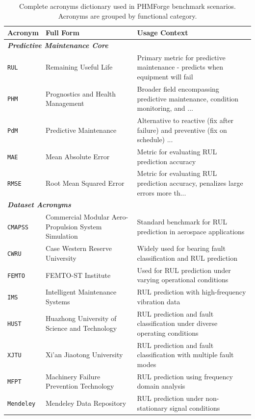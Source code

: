 \begin{table}[ht]
\caption{Complete acronyms dictionary used in PHMForge benchmark scenarios. Acronyms are grouped by functional category.}
\label{app:acronyms}
\centering
\small
\begin{tabular}{@{}lll@{}}
\toprule
\textbf{Acronym} & \textbf{Full Form} & \textbf{Usage Context} \\
\midrule
\multicolumn{3}{l}{\textbf{\textit{Predictive Maintenance Core}}} \\
\texttt{RUL} & Remaining Useful Life & Primary metric for predictive maintenance - predicts when equipment will fail \\
\texttt{PHM} & Prognostics and Health Management & Broader field encompassing predictive maintenance, condition monitoring, and ... \\
\texttt{PdM} & Predictive Maintenance & Alternative to reactive (fix after failure) and preventive (fix on schedule) ... \\
\texttt{MAE} & Mean Absolute Error & Metric for evaluating RUL prediction accuracy \\
\texttt{RMSE} & Root Mean Squared Error & Metric for evaluating RUL prediction accuracy, penalizes large errors more th... \\
\midrule
\multicolumn{3}{l}{\textbf{\textit{Dataset Acronyms}}} \\
\texttt{CMAPSS} & Commercial Modular Aero-Propulsion System Simulation & Standard benchmark for RUL prediction in aerospace applications \\
\texttt{CWRU} & Case Western Reserve University & Widely used for bearing fault classification and RUL prediction \\
\texttt{FEMTO} & FEMTO-ST Institute & Used for RUL prediction under varying operational conditions \\
\texttt{IMS} & Intelligent Maintenance Systems & RUL prediction with high-frequency vibration data \\
\texttt{HUST} & Huazhong University of Science and Technology & RUL prediction and fault classification under diverse operating conditions \\
\texttt{XJTU} & Xi'an Jiaotong University & RUL prediction and fault classification with multiple fault modes \\
\texttt{MFPT} & Machinery Failure Prevention Technology & RUL prediction using frequency domain analysis \\
\texttt{Mendeley} & Mendeley Data Repository & RUL prediction under non-stationary signal conditions \\

\end{tabular}
\end{table}
